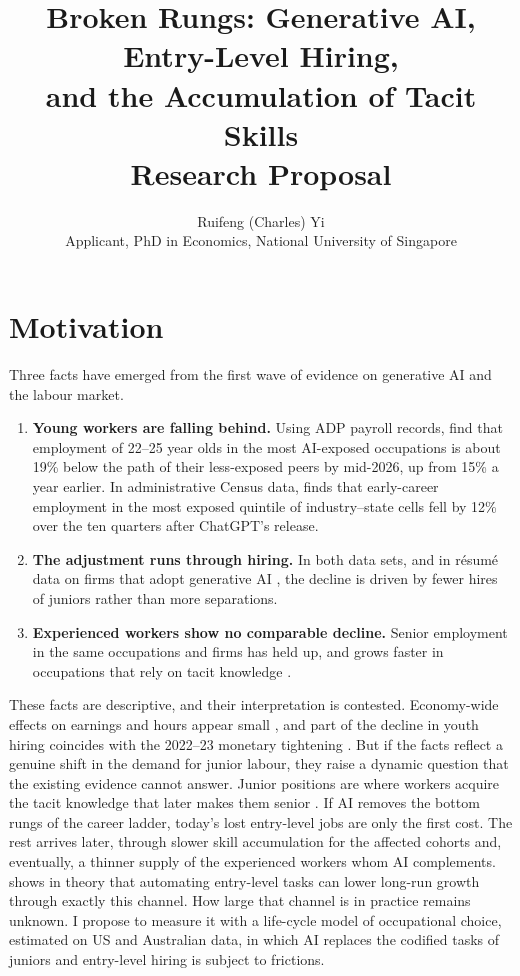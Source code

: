 \documentclass[11pt,a4paper]{article}
\title{\textbf{Broken Rungs: Generative AI, Entry-Level Hiring,\\ and the Accumulation of Tacit Skills}\\[0.4em]\large Research Proposal}
\author{Ruifeng (Charles) Yi\\ \small Applicant, PhD in Economics, National University of Singapore}
\date{}
\begin{document}
\maketitle
\vspace{-1.5em}

\section{Motivation}

Three facts have emerged from the first wave of evidence on generative AI and the labour market.
\begin{enumerate}[label=(\roman*)]
  \item \textbf{Young workers are falling behind.} Using ADP payroll records, \citet{brynjolfsson2026canaries} find that employment of 22--25 year olds in the most AI-exposed occupations is about 19\% below the path of their less-exposed peers by mid-2026, up from 15\% a year earlier. In administrative Census data, \citet{tucker2026} finds that early-career employment in the most exposed quintile of industry--state cells fell by 12\% over the ten quarters after ChatGPT's release.
  \item \textbf{The adjustment runs through hiring.} In both data sets, and in résumé data on firms that adopt generative AI \citep{hosseini2026}, the decline is driven by fewer hires of juniors rather than more separations.
  \item \textbf{Experienced workers show no comparable decline.} Senior employment in the same occupations and firms has held up, and grows faster in occupations that rely on tacit knowledge \citep{brynjolfsson2026canaries, hosseini2026}.
\end{enumerate}

These facts are descriptive, and their interpretation is contested. Economy-wide effects on earnings and hours appear small \citep{humlum2026}, and part of the decline in youth hiring coincides with the 2022--23 monetary tightening \citep{tucker2026}. But if the facts reflect a genuine shift in the demand for junior labour, they raise a dynamic question that the existing evidence cannot answer. Junior positions are where workers acquire the tacit knowledge that later makes them senior \citep{garicano2006}. If AI removes the bottom rungs of the career ladder, today's lost entry-level jobs are only the first cost. The rest arrives later, through slower skill accumulation for the affected cohorts and, eventually, a thinner supply of the experienced workers whom AI complements. \citet{ide2026} shows in theory that automating entry-level tasks can lower long-run growth through exactly this channel. How large that channel is in practice remains unknown. I propose to measure it with a life-cycle model of occupational choice, estimated on US and Australian data, in which AI replaces the codified tasks of juniors and entry-level hiring is subject to frictions.
\end{document}

